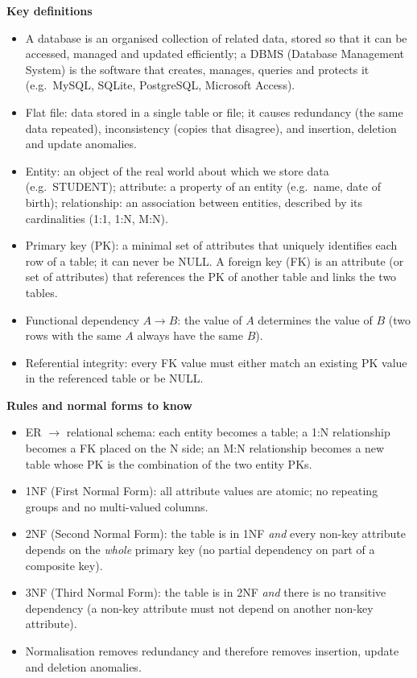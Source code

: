 \documentclass[11pt]{article}
\newcommand{\cle}[1]{{\popxbold\color{popdark}#1}}
\begin{document}
\begin{bilan}
\textbf{Key definitions}
\begin{itemize}
\item A \cle{database} is an organised collection of related data, stored so that it can be accessed, managed and updated efficiently; a \cle{DBMS} (Database Management System) is the software that creates, manages, queries and protects it (e.g.\ MySQL, SQLite, PostgreSQL, Microsoft Access).
\item \cle{Flat file}: data stored in a single table or file; it causes \cle{redundancy} (the same data repeated), \cle{inconsistency} (copies that disagree), and insertion, deletion and update \cle{anomalies}.
\item \cle{Entity}: an object of the real world about which we store data (e.g.\ STUDENT); \cle{attribute}: a property of an entity (e.g.\ name, date of birth); \cle{relationship}: an association between entities, described by its \cle{cardinalities} (1:1, 1:N, M:N).
\item \cle{Primary key} (PK): a minimal set of attributes that uniquely identifies each row of a table; it can never be NULL. A \cle{foreign key} (FK) is an attribute (or set of attributes) that references the PK of another table and links the two tables.
\item \cle{Functional dependency} $A \to B$: the value of $A$ determines the value of $B$ (two rows with the same $A$ always have the same $B$).
\item \cle{Referential integrity}: every FK value must either match an existing PK value in the referenced table or be NULL.
\end{itemize}

\textbf{Rules and normal forms to know}
\begin{itemize}
\item ER $\to$ relational schema: each entity becomes a table; a 1:N relationship becomes a FK placed on the N side; an M:N relationship becomes a new table whose PK is the combination of the two entity PKs.
\item \cle{1NF} (First Normal Form): all attribute values are atomic; no repeating groups and no multi-valued columns.
\item \cle{2NF} (Second Normal Form): the table is in 1NF \emph{and} every non-key attribute depends on the \emph{whole} primary key (no partial dependency on part of a composite key).
\item \cle{3NF} (Third Normal Form): the table is in 2NF \emph{and} there is no transitive dependency (a non-key attribute must not depend on another non-key attribute).
\item Normalisation removes redundancy and therefore removes insertion, update and deletion anomalies.
\end{itemize}


\end{bilan}
\end{document}
